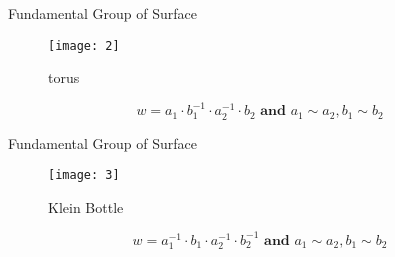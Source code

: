 \documentclass[aspectratio=169]{beamer}
\begin{document}
\begin{frame}{Fundamental Group of Surface}
 \begin{figure}
     \centering
     \texttt{[image: 2]}
     \caption{torus}
     \label{fig:my_label}
 \end{figure}
$$w = a_1 \cdot b_{1}^{-1} \cdot a_{2}^{-1} \cdot b_2 \textbf{ and } a_1 \sim a_2, b_1 \sim b_2$$
\end{frame}
\begin{frame}{Fundamental Group of Surface}
 \begin{figure}
     \centering
     \texttt{[image: 3]}
     \caption{Klein Bottle}
     \label{fig:my_label}
 \end{figure}
$$w = a_{1}^{-1} \cdot b_{1} \cdot a_{2}^{-1} \cdot b_2^{-1} \textbf{ and } a_1 \sim a_2, b_1 \sim b_2$$
\end{frame}






\end{document}
